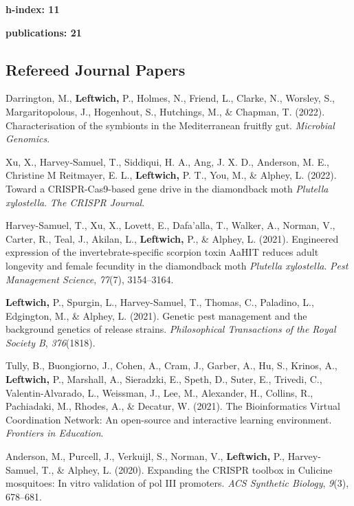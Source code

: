 \documentclass[11pt, a4paper]{awesome-cv}
\begin{document}
\textbf{h-index: 11}

\textbf{publications: 21} \endgroup

\hypertarget{refereed-journal-papers}{%
\subsection{Refereed Journal Papers}\label{refereed-journal-papers}}

\begingroup
\setlength{\parindent}{0.2in}

\hypertarget{refs_journals}{}
\leavevmode\hypertarget{ref-22}{}%
Darrington, M., \textbf{Leftwich,} P., Holmes, N., Friend, L., Clarke,
N., Worsley, S., Margaritopolous, J., Hogenhout, S., Hutchings, M., \&
Chapman, T. (2022). Characterisation of the symbionts in the
{Mediterranean} fruitfly gut. \emph{Microbial Genomics}.

\leavevmode\hypertarget{ref-21}{}%
Xu, X., Harvey-Samuel, T., Siddiqui, H. A., Ang, J. X. D., Anderson, M.
E., Christine M Reitmayer, E. L., \textbf{Leftwich,} P. T., You, M., \&
Alphey, L. (2022). Toward a CRISPR-Cas9-based gene drive in the
diamondback moth \emph{{Plutella} xylostella}. \emph{The CRISPR
Journal}.

\leavevmode\hypertarget{ref-19}{}%
Harvey-Samuel, T., Xu, X., Lovett, E., Dafa'alla, T., Walker, A.,
Norman, V., Carter, R., Teal, J., Akilan, L., \textbf{Leftwich,} P., \&
Alphey, L. (2021). Engineered expression of the invertebrate-specific
scorpion toxin {AaHIT} reduces adult longevity and female fecundity in
the diamondback moth \emph{{Plutella} xylostella}. \emph{Pest Management
Science}, \emph{77}(7), 3154--3164.

\leavevmode\hypertarget{ref-13}{}%
\textbf{Leftwich,} P., Spurgin, L., Harvey-Samuel, T., Thomas, C.,
Paladino, L., Edgington, M., \& Alphey, L. (2021). Genetic pest
management and the background genetics of release strains.
\emph{Philosophical Transactions of the Royal Society B},
\emph{376}(1818).

\leavevmode\hypertarget{ref-20}{}%
Tully, B., Buongiorno, J., Cohen, A., Cram, J., Garber, A., Hu, S.,
Krinos, A., \textbf{Leftwich,} P., Marshall, A., Sieradzki, E., Speth,
D., Suter, E., Trivedi, C., Valentin-Alvarado, L., Weissman, J., Lee,
M., Alexander, H., Collins, R., Pachiadaki, M., Rhodes, A., \& Decatur,
W. (2021). The {Bioinformatics} {Virtual} {Coordination} {Network}: An
open-source and interactive learning environment. \emph{Frontiers in
Education}.

\leavevmode\hypertarget{ref-11}{}%
Anderson, M., Purcell, J., Verkuijl, S., Norman, V., \textbf{Leftwich,}
P., Harvey-Samuel, T., \& Alphey, L. (2020). Expanding the CRISPR
toolbox in {Culicine} mosquitoes: In vitro validation of pol III
promoters. \emph{ACS Synthetic Biology}, \emph{9}(3), 678--681.
\end{document}
